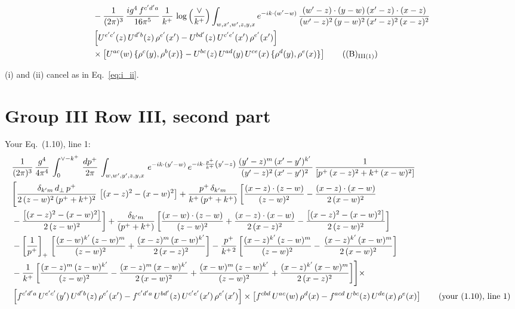 \documentclass[10pt]{article}
\numberwithin{equation}{section}
\begin{document}
\begin{align}
&-\frac{1}{(2\pi)^{3}}\, \frac{ig^{4}\,f^{c'd'a}}{16\pi^{5}}\, \frac{1}{k^{+}}\,\log{\left(\frac{\vee}{k^{+}}\right)}\int_{w,x',w',z,y,x} e^{-ik\cdot (w'-w)}\,\frac{(w'-z)\cdot (y-w)\,(x'-z)\cdot (x-z)}{(w'-z)^{2}\,(y-w)^{2}\,(x'-z)^{2}\,(x-z)^{2}}\notag \\
& \left[U^{e'c'}(z)\,U^{d'b}(z)\,\rho^{e'}(x')-U^{bd'}(z)\,U^{c'e'}(x')\,\rho^{e'}(x')\right]\notag \\
& \times\left[U^{ac}(w)\, \{\rho^{c}(y),\rho^{b}(x)\}-U^{bc}(z)\,U^{ad}(y)\,U^{ce}(x)\,\{\rho^{d}(y),\rho^{e}(x)\}\right]\tag{(B)$_{\rm III(1)}$}
\end{align}

\noindent (i) and (ii) cancel as in Eq.~\eqref{eq:i_ii}.

\section{Group III Row III, second part}
Your Eq.~(1.10), line 1:
\begin{align}
&\frac{1}{(2\pi)^{3}}\,\frac{g^{4}}{4\pi^{4}}\,\int_{0}^{\vee-k^{+}}\, \frac{dp^{+}}{2\pi}\,\int_{w,w',y',z,y,x}\, e^{-ik\cdot (y'-w)}\,e^{-ik\cdot \frac{p^{+}}{k^{+}}\left(y'-z\right)}\, \frac{(y'-z)^{m}\,(x'-y')^{k'}\,}{(y'-z)^{2}\,(x'-y')^{2}\,}\, \frac{1}{\left[p^{+}\,(x-z)^{2}+k^{+}\,(x-w)^{2}\right]}\notag \\ & \Bigg[\frac{\delta_{k'm}\,d_{\perp}\,p^{+}}{2\,(z-w)^{2}\,(p^{+}+k^{+})^{2}}\, \left[(x-z)^{2}-(x-w)^{2}\right]+\frac{p^{+}\,\delta_{k'm}}{k^{+}\,(p^{+}+k^{+})}\,\bigg[\frac{(x-z)\cdot (z-w)}{(z-w)^{2}} -\frac{(x-z)\cdot (x-w)}{2\,(x-w)^{2}}\notag \\ & -\frac{\left[(x-z)^{2}-(x-w)^{2}\right]}{2\,(z-w)^{2}}\bigg] +\frac{\delta_{k'm}}{(p^{+}+k^{+})}\,\bigg[\frac{(x-w)\cdot (z-w)}{(z-w)^{2}}+\frac{(x-z)\cdot (x-w)}{2\,(x-z)^{2}} -\frac{\left[(x-z)^{2}-(x-w)^{2}\right]}{2\,(z-w)^{2}}\bigg]\notag \\ & -\left[\frac{1}{p^{+}}\right]_{+}\,\bigg[\frac{(x-w)^{k'}\,(z-w)^{m}}{(z-w)^{2}}+\frac{(x-z)^{m}\,(x-w)^{k'}}{2\,(x-z)^{2}}\bigg]-\frac{p^{+}}{k^{+\,2}}\,\bigg[\frac{(x-z)^{k'}\,(z-w)^{m}}{(z-w)^{2}} -\,\frac{(x-z)^{k'}\,(x-w)^{m}}{2\,(x-w)^{2}}\bigg]\notag \\ & -\frac{1}{k^{+}}\,\bigg[\frac{(x-z)^{m}\,(z-w)^{k'}}{(z-w)^{2}}-\frac{(x-z)^{m}\,(x-w)^{k'}}{2\,(x-w)^{2}}+\frac{(x-w)^{m}\,(z-w)^{k'}}{(z-w)^{2}} +\frac{(x-z)^{k'}\,(x-w)^{m}}{2\,(x-z)^{2}}\bigg]\Bigg]\times\,\notag \\ & \left[f^{c'd'a}\,U^{e'c'}(y')\,U^{d'b}(z)\,\rho^{e'}(x')-f^{c'd'a}\, 
    U^{bd'}(z)\,U^{c'e'}(x')\,\rho^{e'}(x')\right]\times \left[f^{cbd}\,U^{ac}(w)\,\rho^{d}(x) -f^{acd}\,U^{bc}(z)\,U^{de}(x)\,\rho^{e}(x)\right]\tag{your (1.10), line 1}
\end{align}
\end{document}
